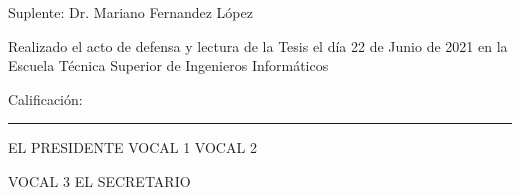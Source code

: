 \documentclass[twoside,11pt]{Latex/Classes/PhDthesisPSnPDF}
\begin{document}
\vspace{5mm}
Suplente: \hspace{1.5mm} Dr. Mariano Fernandez López

\vspace{10mm}
\noindent Realizado el acto de defensa y lectura de la Tesis el d\'{i}a 22 de Junio de 2021 en la Escuela T\'ecnica Superior de Ingenieros Inform\'aticos

\vspace{5mm}
\noindent Calificaci\'{o}n: \rule{123mm}{0.2mm}
\vspace{20mm}

EL PRESIDENTE \hspace{30mm} VOCAL 1 \hspace{30mm} VOCAL 2

\vspace{30mm}
\hspace{15mm} VOCAL 3 \hspace{45mm} EL SECRETARIO

%




\cleardoublepage


\cleardoublepage



\cleardoublepage


\cleardoublepage
\setcounter{secnumdepth}{3} %
\setcounter{tocdepth}{3}    %

\tableofcontents           %




\listoffigures	%
\end{document}
